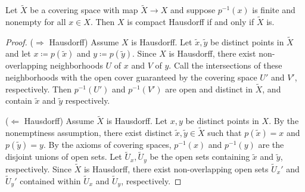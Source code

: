 \documentclass[a5paper]{article}
\newcommand{\wt}{\widetilde}
\begin{document}

\begin{proposition*}
	Let $\wt{X}$ be a covering space with map $\wt{X}\to X$ and suppose
  $p^{-1}(x)$ is finite and nonempty for all $x\in X$. Then $X$ is compact
  Hausdorff if and only if $\wt{X}$ is.
\end{proposition*}
\begin{proof}
	($\Rightarrow$ Hausdorff) Assume $X$ is Hausdorff. Let $\wt{x},\wt{y}$ be
  distinct points in $\wt{X}$ and let $x\coloneqq p(\wt{x})$
  and $y\coloneqq p(\wt{y})$. Since $X$ is Hausdorff, there exist non-overlapping
  neighborhoods $U$ of $x$ and $V$ of $y$. Call the intersections of these
  neighborhoods with the open cover guaranteed by the covering space $U'$ and
  $V'$, respectively. Then $p^{-1}(U')$ and $p^{-1}(V')$ are open and distinct
  in $\wt{X}$, and contain $\wt{x}$ and $\wt{y}$ respectively.

	($\Leftarrow$ Hausdorff) Assume $\wt{X}$ is Hausdorff. Let $x,y$ be
  distinct points in $X$. By the nonemptiness assumption, there exist
  distinct $\wt{x},\wt{y}\in\wt{X}$ such that $p(\wt{x})=x$ and $p(\wt{y})=y$.
  By the axioms of covering spaces, $p^{-1}(x)$ and $p^{-1}(y)$ are the disjoint
  unions of open sets. Let $\wt{U}_x,\wt{U}_y$ be the open sets containing
  $\wt{x}$ and $\wt{y}$, respectively. Since $\wt{X}$ is Hausdorff, there exist
  non-overlapping open sets $\wt{U}_x'$ and $\wt{U}_y'$ contained within
  $\wt{U}_x$ and $\wt{U}_y$, respectively.
\end{proof}
\end{document}
